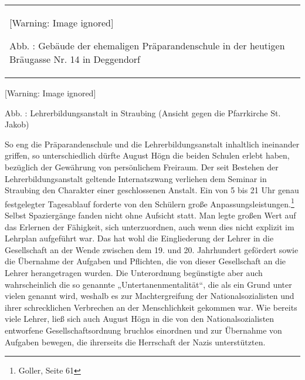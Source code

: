 \documentclass[a4paper]{article}
\newcounter{Abb}
\renewcommand\theAbb{\arabic{Abb}}
\begin{document}
\begin{center}
\begin{minipage}{5.408cm}
\begin{center}
\tablefirsthead{}
\tablehead{}
\tabletail{}
\tablelasttail{}
\begin{supertabular}{m{5.208cm}}
  [Warning: Image ignored] %
 
\label{bkm:Ref100297470}Abb. \stepcounter{Abb}{\theAbb}: Gebäude der
ehemaligen Präparandenschule in der heutigen Bräugasse Nr. 14 in
Deggendorf\\
\end{supertabular}
\end{center}
\end{minipage}
\end{center}
  [Warning: Image ignored] %
 

Abb. \stepcounter{Abb}{\theAbb}: Lehrerbildungsanstalt in Straubing
(Ansicht gegen die Pfarrkirche St. Jakob)

So eng die Präparandenschule und die Lehrerbildungsanstalt inhaltlich
ineinander griffen, so unterschiedlich dürfte August Högn die beiden
Schulen erlebt haben, bezüglich der Gewährung von persönlichem
Freiraum. Der seit Bestehen der Lehrerbildungsanstalt geltende
Internatszwang verliehen dem Seminar in Straubing den Charakter einer
geschlossenen Anstalt. Ein von 5 bis 21 Uhr genau festgelegter
Tagesablauf forderte von den Schülern große
Anpassungsleistungen.\footnote{ Goller, Seite 61} Selbst Spaziergänge
fanden nicht ohne Aufsicht statt. Man legte großen Wert auf das
Erlernen der Fähigkeit, sich unterzuordnen, auch wenn dies nicht
explizit im Lehrplan aufgeführt war. Das hat wohl die Eingliederung der
Lehrer in die Gesellschaft an der Wende zwischen dem 19. und 20.
Jahrhundert gefördert sowie die Übernahme der Aufgaben und Pflichten,
die von dieser Gesellschaft an die Lehrer herangetragen wurden. Die
Unterordnung begünstigte aber auch wahrscheinlich die so genannte
„Untertanenmentalität“, die als ein Grund unter vielen genannt wird,
weshalb es zur Machtergreifung der Nationalsozialisten und ihrer
schrecklichen Verbrechen an der Menschlichkeit gekommen war. Wie
bereits viele Lehrer, ließ sich auch August Högn in die von den
Nationalsozialisten entworfene Gesellschaftsordnung bruchlos einordnen
und zur Übernahme von Aufgaben bewegen, die ihrerseits die Herrschaft
der Nazis unterstützten.
\end{document}
